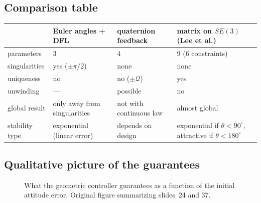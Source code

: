 \documentclass[11pt,a4paper]{article}
\theoremstyle{definition}
\theoremstyle{plain}
\theoremstyle{remark}
\begin{document}
\subsection{Comparison table}

\begin{center}
\small
\begin{tabular}{p{3.3cm} p{3.3cm} p{3.3cm} p{3.4cm}}
\toprule
 & Euler angles + DFL & quaternion feedback & matrix on $SE(3)$ (Lee et al.) \\
\midrule
parameters & 3 & 4 & 9 (6 constraints) \\
singularities & yes ($\pm\pi/2$) & none & none \\
uniqueness & no & no ($\pm\mathcal Q$) & yes \\
unwinding & --- & possible & no \\
global result & only away from singularities & not with continuous law & almost global \\
stability type & exponential (linear error) & depends on design & exponential if $\theta<90^\circ$, attractive if $\theta<180^\circ$ \\
\bottomrule
\end{tabular}
\end{center}

\subsection{Qualitative picture of the guarantees}

\begin{figure}[h]
\centering
{}
\caption{What the geometric controller guarantees as a function of the initial attitude error. Original figure summarizing slides~24 and 37.}
\end{figure}
\end{document}
